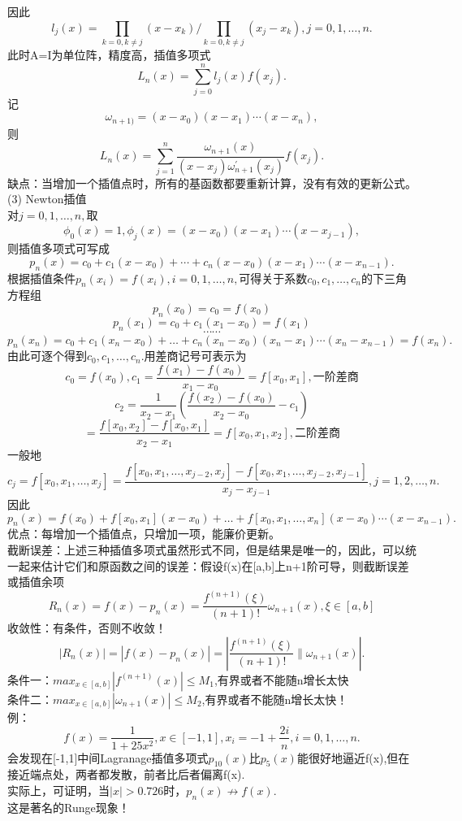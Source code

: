 \documentclass[a4paper,12pt]{article}
\begin{document}
\begin{CJK*}{UTF8}{gbsn}
	因此
	$$ l_j(x) = \prod\limits_{k=0,k\neq j}(x-x_k)/\prod\limits_{k=0,k\neq j}(x_j-x_k),j=0,1,\ldots,n.  $$
	此时A=I为单位阵，精度高，插值多项式
	$$ L_n(x)= \sum\limits_{j=0}^nl_j(x)f(x_j).  $$
	记$$\omega_{n+1)} = (x-x_0)(x-x_1)\cdots(x-x_n),$$
	则$$L_n(x) = \sum\limits_{j=1}^n\frac{\omega_{n+1}(x)}{(x-x_j)\omega_{n+1}^{'}(x_j)}f(x_j).$$
	缺点：当增加一个插值点时，所有的基函数都要重新计算，没有有效的更新公式。\\
	(3) Newton插值\\
	对$j=0,1,\ldots,n,$取$$\phi_0(x)=1,\phi_j(x)=(x-x_0)(x-x_1)\cdots(x-x_{j-1}),$$
	则插值多项式可写成$$p_n(x)=c_0+c_1(x-x_0)+\cdots+c_n(x-x_0)(x-x_1)\cdots(x-x_{n-1}).$$
	根据插值条件$p_n(x_i)=f(x_i),i=0,1,\ldots,n,$可得关于系数$c_0,c_1,\ldots,c_n$的下三角方程组
	$$ p_n(x_0) = c_0 = f(x_0)$$
	$$p_n(x_1) = c_0 + c_1(x_1 - x_0) = f(x_1)$$
	$$	\cdots	\cdots$$
	$$p_n(x_n) = c_0 + c_1(x_n-x_0)+\dots+c_n(x_n-x_0)(x_n-x_1)\cdots(x_n-x_{n-1})=f(x_n).$$
	由此可逐个得到$c_0,c_1,\ldots,c_n$.用差商记号可表示为\\
	$$c_0=f(x_0),c_1=\frac{f(x_1)-f(x_0)}{x_1-x_0}=f[x_0,x_1],\text{一阶差商}$$
	$$c_2=\frac{1}{x_2-x_1}(\frac{f(x_2)-f(x_0)}{x_2-x_0}-c_1)$$
	$$=\frac{f[x_0,x_2]-f[x_0,x_1]}{x_2-x_1}=f[x_0,x_1,x_2],\text{二阶差商}$$
	一般地
	$$c_j=f[x_0,x_1,\ldots,x_j]=\frac{f[x_0,x_1,\ldots,x_{j-2},x_j]-f[x_0,x_1,\ldots,x_{j-2},x_{j-1}]}{x_j-x_{j-1}},j=1,2,\ldots,n.$$
	因此
	$$p_n(x) = f(x_0)+f[x_0,x_1](x-x_0)+\ldots+f[x_0,x_1,\ldots,x_n](x-x_0)\cdots(x-x_{n-1}).$$
	优点：每增加一个插值点，只增加一项，能廉价更新。\\
	截断误差：上述三种插值多项式虽然形式不同，但是结果是唯一的，因此，可以统一起来估计它们和原函数之间的误差：假设f(x)在[a,b]上n+1阶可导，则截断误差或插值余项
	$$ R_n(x)=f(x)-p_n(x)=\frac{f^{(n+1)}(\xi)}{(n+1)!}\omega_{n+1}(x),\xi \in [a,b] $$
	收敛性：有条件，否则不收敛！
	$$ |R_n(x)|=|f(x)-p_n(x)|=|\frac{f^{(n+1)}(\xi)}{(n+1)!}\|\omega_{n+1}(x)|.  $$
	条件一：$max_{x\in[a,b]}|f^{(n+1)}(x)|\le M_1$,有界或者不能随n增长太快\\
	条件二：$max_{x\in[a,b]}|\omega_{n+1}(x)|\le M_2$,有界或者不能随n增长太快！\\
	例：
	$$ f(x) = \frac{1}{1+25x^2},x\in[-1,1],x_i=-1+\frac{2i}{n},i=0,1,\ldots,n.$$
	会发现在[-1,1]中间Lagranage插值多项式$p_10(x)$比$p_5(x)$能很好地逼近f(x),但在接近端点处，两者都发散，前者比后者偏离f(x).\\
	实际上，可证明，当$|x|>0.726$时，$p_n(x) \not\rightarrow f(x)$.\\
	这是著名的Runge现象！\\

\end{CJK*}
\end{document}
